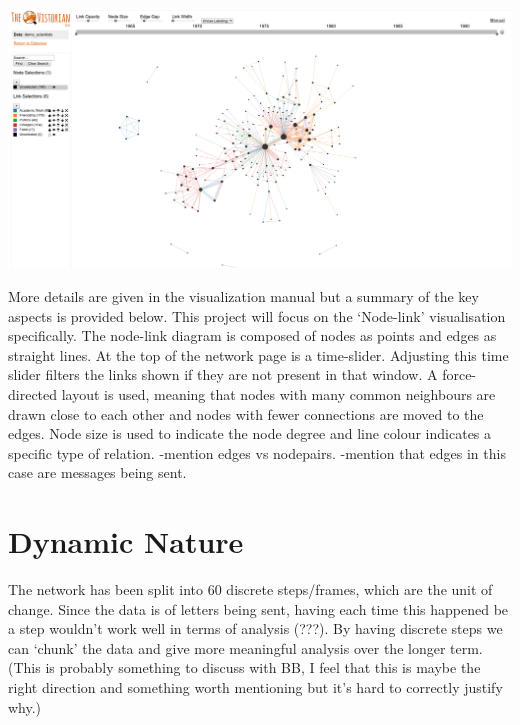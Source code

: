 \begin{center}
\includegraphics[trim={0 0 0 0}, width=140mm]{./Figures/vistorianOriginal.png}
\end{center}

More details are given in the visualization manual \cite{vismanual} but a summary of the key aspects is provided below.
This project will focus on the ‘Node-link’ visualisation specifically. The node-link diagram is composed of nodes as points and edges as straight lines. At the top of the network page is a time-slider. Adjusting this time slider filters the links shown if they are not present in that window. A force-directed layout is used, meaning that nodes with many common neighbours are drawn close to each other and nodes with fewer connections are moved to the edges. Node size is used to indicate the node degree and line colour indicates a specific type of relation.\newline
-mention edges vs nodepairs.\newline
-mention that edges in this case are messages being sent.


\section{Dynamic Nature}
The network has been split into 60 discrete steps/frames, which are the unit of change. Since the data is of letters being sent, having each time this happened be a step wouldn’t work well in terms of analysis (???). By having discrete steps we can ‘chunk’ the data and give more meaningful analysis over the longer term. (This is probably something to discuss with BB, I feel that this is maybe the right direction and something worth mentioning but it’s hard to correctly justify why.)








